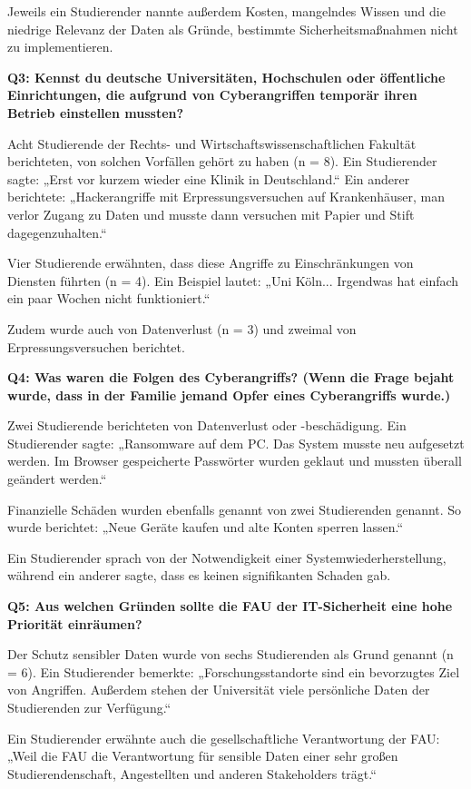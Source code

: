 \documentclass[german,report]{i1thesis}
\begin{document}
Jeweils ein Studierender nannte außerdem Kosten, mangelndes Wissen und die niedrige Relevanz der Daten als Gründe, bestimmte Sicherheitsmaßnahmen nicht zu implementieren.

\textbf{Q3: Kennst du deutsche Universitäten, Hochschulen oder öffentliche Einrichtungen, die aufgrund von Cyberangriffen temporär ihren Betrieb einstellen mussten?}

Acht Studierende der Rechts- und Wirtschaftswissenschaftlichen Fakultät berichteten, von solchen Vorfällen gehört zu haben (n = 8). Ein Studierender sagte: „Erst vor kurzem wieder eine Klinik in Deutschland.“ Ein anderer berichtete: „Hackerangriffe mit Erpressungsversuchen auf Krankenhäuser, man verlor Zugang zu Daten und musste dann versuchen mit Papier und Stift dagegenzuhalten.“

Vier Studierende erwähnten, dass diese Angriffe zu Einschränkungen von Diensten führten (n = 4). Ein Beispiel lautet: „Uni Köln... Irgendwas hat einfach ein paar Wochen nicht funktioniert.“

Zudem wurde auch von Datenverlust (n = 3) und zweimal von Erpressungsversuchen berichtet.

\textbf{Q4: Was waren die Folgen des Cyberangriffs? (Wenn die Frage bejaht wurde, dass in der Familie jemand Opfer eines Cyberangriffs wurde.)}

Zwei Studierende berichteten von Datenverlust oder -beschädigung. Ein Studierender sagte: „Ransomware auf dem PC. Das System musste neu aufgesetzt werden. Im Browser gespeicherte Passwörter wurden geklaut und mussten überall geändert werden.“

Finanzielle Schäden wurden ebenfalls genannt von zwei Studierenden genannt. So wurde berichtet: „Neue Geräte kaufen und alte Konten sperren lassen.“

Ein Studierender sprach von der Notwendigkeit einer Systemwiederherstellung, während ein anderer sagte, dass es keinen signifikanten Schaden gab.

\textbf{Q5: Aus welchen Gründen sollte die FAU der IT-Sicherheit eine hohe Priorität einräumen?}

Der Schutz sensibler Daten wurde von sechs Studierenden als Grund genannt (n = 6). Ein Studierender bemerkte: „Forschungsstandorte sind ein bevorzugtes Ziel von Angriffen. Außerdem stehen der Universität viele persönliche Daten der Studierenden zur Verfügung.“

Ein Studierender erwähnte auch die gesellschaftliche Verantwortung der FAU: „Weil die FAU die Verantwortung für sensible Daten einer sehr großen Studierendenschaft, Angestellten und anderen Stakeholders trägt.“
\end{document}
